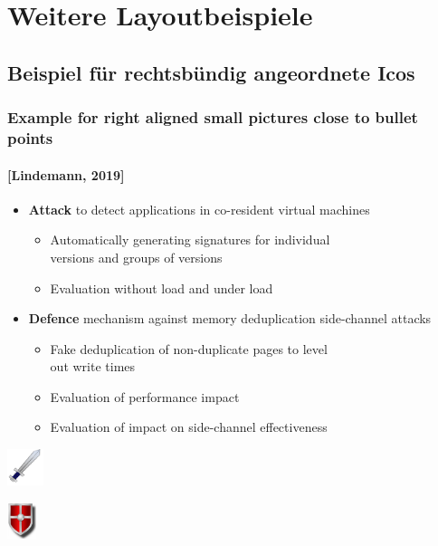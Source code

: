 \documentclass[t,aspectratio=169]{beamer}
\begin{document}
\section{Weitere Layoutbeispiele} %
\subsection{Beispiel für rechtsbündig angeordnete Icos} %

\begin{frame}
	\frametitle{Example for right aligned small pictures close to bullet points}
	\framesubtitle{[Lindemann, 2019]}
	\begin{itemize}
		\item \textbf{Attack} to detect applications in co-resident virtual machines 
		\begin{itemize}
			\item Automatically generating signatures for individual \\ versions and groups of versions
			\item Evaluation without load and under load
		\end{itemize}
		\item \medskip \textbf{Defence} mechanism against memory deduplication side-channel attacks
		\begin{itemize}
			\item Fake deduplication of non-duplicate pages to level \\ out write times
			\item Evaluation of performance impact
			\item Evaluation of impact on side-channel effectiveness
		\end{itemize}
	\end{itemize}
	\raggedleft %
	\par\vspace{-4.5cm} %
	\includegraphics[height=40px]{../pic/sword.pdf} %
	\par\vspace{1.4cm} %
	\includegraphics[height=40px]{../pic/shield.pdf} %
\end{frame}
\end{document}
